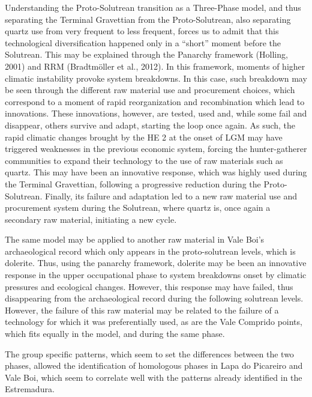 \documentclass[12pt,twoside]{reedthesis}
\begin{document}
Understanding the Proto-Solutrean transition as a Three-Phase model, and thus separating the Terminal Gravettian from the Proto-Solutrean, also separating quartz use from very frequent to less frequent, forces us to admit that this technological diversification happened only in a ``short'' moment before the Solutrean. This may be explained through the Panarchy framework (Holling, 2001) and RRM (Bradtmöller et al., 2012). In this framework, moments of higher climatic instability provoke system breakdowns. In this case, such breakdown may be seen through the different raw material use and procurement choices, which correspond to a moment of rapid reorganization and recombination which lead to innovations. These innovations, however, are tested, used and, while some fail and disappear, others survive and adapt, starting the loop once again. As such, the rapid climatic changes brought by the HE 2 at the onset of LGM may have triggered weaknesses in the previous economic system, forcing the hunter-gatherer communities to expand their technology to the use of raw materials such as quartz. This may have been an innovative response, which was highly used during the Terminal Gravettian, following a progressive reduction during the Proto-Solutrean. Finally, its failure and adaptation led to a new raw material use and procurement system during the Solutrean, where quartz is, once again a secondary raw material, initiating a new cycle.

The same model may be applied to another raw material in Vale Boi's archaeological record which only appears in the proto-solutrean levels, which is dolerite. Thus, using the panarchy framework, dolerite may be been an innovative response in the upper occupational phase to system breakdowns onset by climatic pressures and ecological changes. However, this response may have failed, thus disappearing from the archaeological record during the following solutrean levels. However, the failure of this raw material may be related to the failure of a technology for which it was preferentially used, as are the Vale Comprido points, which fits equally in the model, and during the same phase.

The group specific patterns, which seem to set the differences between the two phases, allowed the identification of homologous phases in Lapa do Picareiro and Vale Boi, which seem to correlate well with the patterns already identified in the Estremadura.
\end{document}
